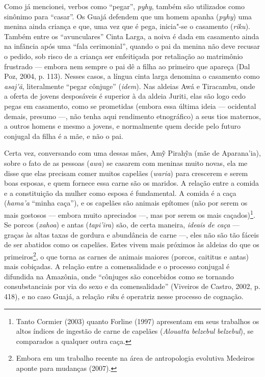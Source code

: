 Como já mencionei, verbos como ``pegar'', \emph{pyhy}, também são
utilizados como sinônimo para ``casar''. Os Guajá defendem que um homem
apanha (\emph{pyhy}) uma menina ainda criança e que, uma vez que é pega,
inicia"-se o casamento (\emph{riku}). Também entre os ``avunculares''
Cinta Larga, a noiva é dada em casamento ainda na infância após uma
``fala cerimonial'', quando o pai da menina não deve recusar o pedido, sob
risco de a criança ser enfeitiçada por retaliação ao matrimônio
frustrado --- embora nem sempre o pai dê a filha ao primeiro que apareça
(Dal Poz, 2004, p. 113). Nesses casos, a língua cinta larga denomina o
casamento como \emph{asaj'ã}, literalmente ``pegar cônjuge'' (\emph{idem}). Nas
aldeias Awá e Tiracambu, onde a oferta de jovens desposáveis é
superior à da aldeia Juriti, elas são logo cedo pegas em casamento, como
se prometidas (embora essa última ideia --- ocidental demais, presumo ---,
não tenha aqui rendimento etnográfico) a seus tios maternos, a outros
homens e mesmo a jovens, e normalmente quem decide pelo futuro conjugal
da filha é a mãe, e não o pai.

Certa vez, conversando com uma dessas mães, Amỹ Pirahỹa (mãe de
Aparana'ia), sobre o fato de as pessoas (\emph{awa}) se casarem com
meninas muito novas, ela me disse que elas precisam comer muitos
capelães (\emph{waria}) para crescerem e serem boas esposas, e quem
fornece essa carne são os maridos. A relação entre a comida e a
constituição da mulher como esposa é fundamental. A comida é a caça
(\emph{hama'a} ``minha caça''), e os capelães são animais epítomes (não
por serem os mais gostosos --- embora muito apreciados ---, mas por serem os
mais caçados)\footnote{Tanto Cormier (2003) quanto Forline (1997)
  apresentam em seus trabalhos os altos índices de ingestão de carne de
  capelães (\emph{Alouatta} \emph{belzebul} \emph{belzebul}), se
  comparados a qualquer outra caça.}. Se porcos (\emph{xahoa}) e antas
(\emph{tapi'ira}) são, de certa maneira, \emph{ideais de caça} --- graças
às altas taxas de gordura e abundância de carne ---, eles não são tão
fáceis de ser abatidos como os capelães. Estes vivem mais próximos às
aldeias do que os primeiros\footnote{Embora em um trabalho recente na
  área de antropologia evolutiva Medeiros aponte para mudanças (2007).},
o que torna as carnes de animais maiores (porcos, caititus e antas) mais
cobiçadas. A relação entre a comensalidade e o processo conjugal é
difundida na Amazônia, onde ``cônjuges são concebidos como se tornando
consubstanciais por via do sexo e da comensalidade'' (Viveiros de Castro,
2002, p. 418), e no caso Guajá, a relação \emph{riku} é operatriz nesse
processo de cognação.

